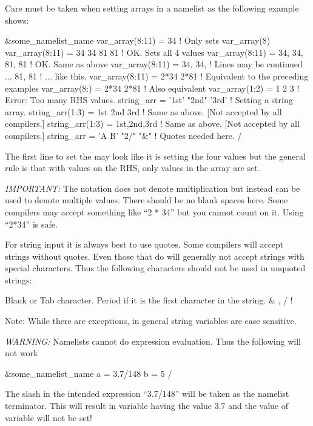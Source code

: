 Care must be taken when setting arrays in a namelist as the following example shows:
\begin{example}
  &some_namelist_name
    var_array(8:11) = 34             ! Only sets var_array(8)
    var_array(8:11) = 34 34 81 81    ! OK. Sets all 4 values
    var_array(8:11) = 34, 34, 81, 81 ! OK. Same as above
    var_array(8:11) = 34, 34,        ! Lines may be continued ...
                      81, 81         !   ... like this.
    var_array(8:11) = 2*34 2*81      ! Equivalent to the preceding examples
    var_array(8:)   = 2*34 2*81      ! Also equivalent
    var_array(1:2) = 1 2 3           ! Error: Too many RHS values.
    string_arr = '1st' "2nd" '3rd'   ! Setting a string array.
    string_arr(1:3) = 1st 2nd 3rd    ! Same as above. [Not accepted by all compilers.]
    string_arr(1:3) = 1st,2nd,3rd    ! Same as above. [Not accepted by all compilers.]
    string_arr = 'A B' "2/" "&"      ! Quotes needed here.
  /
\end{example}
The first line to set the  may look like it is setting the four values
 but the general rule is that with  values on the RHS, only  values
in the array are set.

{\em IMPORTANT:} The notation  does not denote multiplication but instead can be used to
denote multiple values. There should be no blank spaces here. Some compilers may accept something
like ``2 * 34'' but you cannot count on it. Using ``2*34'' is safe.

For string input it is always best to use quotes. Some compilers will accept strings without
quotes. Even those that do will generally not accept strings with special characters.  Thus the
following characters should not be used in unquoted strings:
\begin{example}
  Blank or Tab character.
  Period if it is the first character in the string.
  &   ,   /    !   %
\end{example}
Note: While there are exceptions, in general \tao string variables are
case sensitive.

{\em WARNING:} Namelists cannot do expression evaluation. Thus the following will not work
\begin{example}
  &some_namelist_name
    a = 3.7/148
    b = 5
  /
\end{example}
The slash in the intended expression ``3.7/148'' will be taken as the namelist terminator. This
will result in variable  having the value 3.7 and the value of variable  will not
be set!


